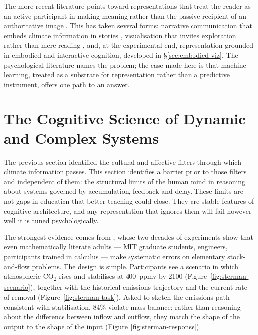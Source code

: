 The more recent literature points toward representations that treat the reader as an active participant in making meaning rather than the passive recipient of an authoritative image \citep{marlon2019, ojala2023}. This has taken several forms: narrative communication that embeds climate information in stories \citep{morris2019}, visualisation that invites exploration rather than mere reading \citep{cornerclimate2015}, and, at the experimental end, representation grounded in embodied and interactive cognition, developed in §\ref{sec:embodied-viz}. The psychological literature names the problem; the case made here is that machine learning, treated as a substrate for representation rather than a predictive instrument, offers one path to an answer.

\section{The Cognitive Science of Dynamic and Complex Systems}
\label{sec:cognitive-science}

The previous section identified the cultural and affective filters through which climate information passes. This section identifies a barrier prior to those filters and independent of them: the structural limits of the human mind in reasoning about systems governed by accumulation, feedback and delay. These limits are not gaps in education that better teaching could close. They are stable features of cognitive architecture, and any representation that ignores them will fail however well it is tuned psychologically.

The strongest evidence comes from \citet{sterman2008}, whose two decades of experiments show that even mathematically literate adults --- MIT graduate students, engineers, participants trained in calculus --- make systematic errors on elementary stock-and-flow problems. The design is simple. Participants see a scenario in which atmospheric CO\textsubscript{2} rises and stabilises at 400~ppmv by 2100 (Figure~\ref{fig:sterman-scenario}), together with the historical emissions trajectory and the current rate of removal (Figure~\ref{fig:sterman-task}). Asked to sketch the emissions path consistent with stabilisation, 84\% violate mass balance: rather than reasoning about the difference between inflow and outflow, they match the shape of the output to the shape of the input (Figure~\ref{fig:sterman-response}).

